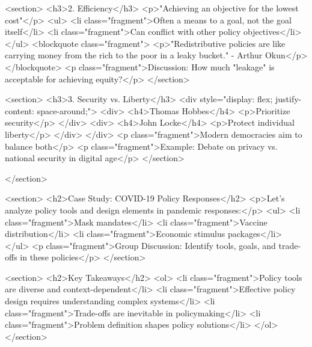             <section>
                <h3>2. Efficiency</h3>
                <p>"Achieving an objective for the lowest cost"</p>
                <ul>
                    <li class="fragment">Often a means to a goal, not the goal itself</li>
                    <li class="fragment">Can conflict with other policy objectives</li>
                </ul>
                <blockquote class="fragment">
                    <p>"Redistributive policies are like carrying money from the rich to the poor in a leaky bucket." - Arthur Okun</p>
                </blockquote>
                <p class="fragment">Discussion: How much "leakage" is acceptable for achieving equity?</p>
            </section>

            <section>
                <h3>3. Security vs. Liberty</h3>
                <div style="display: flex; justify-content: space-around;">
                    <div>
                        <h4>Thomas Hobbes</h4>
                        <p>Prioritize security</p>
                    </div>
                    <div>
                        <h4>John Locke</h4>
                        <p>Protect individual liberty</p>
                    </div>
                </div>
                <p class="fragment">Modern democracies aim to balance both</p>
                <p class="fragment">Example: Debate on privacy vs. national security in digital age</p>
            </section>

        </section>

            <section>
                <h2>Case Study: COVID-19 Policy Responses</h2>
                <p>Let's analyze policy tools and design elements in pandemic responses:</p>
                <ul>
                    <li class="fragment">Mask mandates</li>
                    <li class="fragment">Vaccine distribution</li>
                    <li class="fragment">Economic stimulus packages</li>
                </ul>
                <p class="fragment">Group Discussion: Identify tools, goals, and trade-offs in these policies</p>
            </section>

            <section>
                <h2>Key Takeaways</h2>
                <ol>
                    <li class="fragment">Policy tools are diverse and context-dependent</li>
                    <li class="fragment">Effective policy design requires understanding complex systems</li>
                    <li class="fragment">Trade-offs are inevitable in policymaking</li>
                    <li class="fragment">Problem definition shapes policy solutions</li>
                </ol>
            </section>